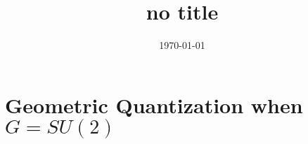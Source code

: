 \documentclass[]{article}
\title{no title}
\date{\today}
\begin{document}


\section{Geometric Quantization when $G=SU(2)$}

%
\end{document}
